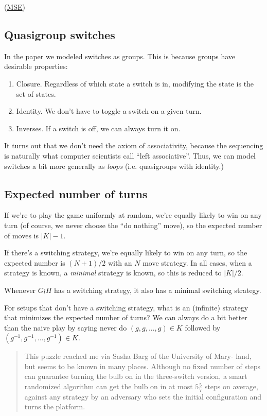 (\href{https://math.stackexchange.com/q/3706654/121988}{MSE})

\subsection{Quasigroup switches}
In the paper we modeled switches as groups.
This is because groups have desirable properties: \begin{enumerate}
  \item Closure. Regardless of which state a switch is in, modifying the state is the set of states.
  \item Identity. We don't have to toggle a switch on a given turn.
  \item Inverses. If a switch is off, we can always turn it on.
\end{enumerate}

It turns out that we don't need the axiom of associativity,
because the sequencing is naturally what computer scientists call
``left associative''. Thus, we can model switches a bit more generally as
\textit{loops} (i.e. quasigroups with identity.)

\subsection{Expected number of turns}
If we're to play the game uniformly at random, we're equally likely to win on
any turn (of course, we never choose the ``do nothing'' move), so the expected
number of moves is $|K| - 1$.

If there's a switching strategy, we're equally likely to win on any turn, so
the expected number is $(N+1)/2$ with an $N$ move strategy. In all cases,
when a strategy is known, a \textit{minimal} strategy is known, so this is
reduced to $|K|/2$.

\begin{conjecture}
  Whenever $G \wr H$ has a switching strategy, it also has a minimal switching
  strategy.
\end{conjecture}

For setups that don't have a switching strategy, what is an (infinite) strategy
that minimizes the expected number of turns?
We can always do a bit better than the naive play by saying never do
$(g,g, ..., g) \in K$ followed by $(g^{-1},g^{-1}, ..., g^{-1}) \in K$.

\begin{quote}
  This puzzle reached me via Sasha Barg of the University of Mary-
  land, but seems to be known in many places. Although no fixed number of steps
  can guarantee turning the bulb on in the three-switch version, a smart randomized
  algorithm can get the bulb on in at most $5 \frac{5}{7}$ steps on average, against any strategy
  by an adversary who sets the initial configuration and turns the platform. \cite{Winkler2021}
\end{quote}

